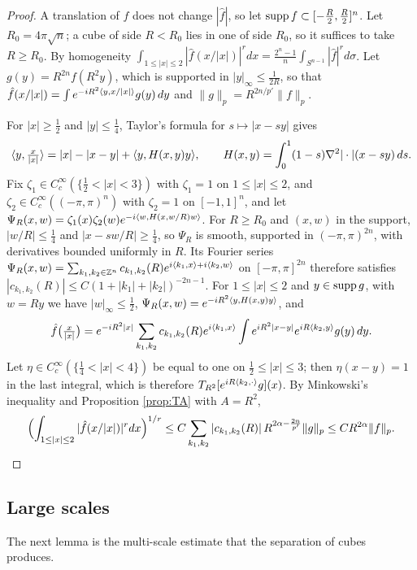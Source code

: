 \begin{proof}
A translation of $f$ does not change $|\hat f|$, so let $\operatorname{supp} f\subset[-\frac R2,\frac R2]^n$. Let
$R_0=4\pi\sqrt n$; a cube of side $R<R_0$ lies in one of side $R_0$, so it suffices to take $R\ge R_0$. By
homogeneity $\int_{1\le|x|\le2}|\hat f(x/|x|)|^rdx=\frac{2^n-1}n\int_{S^{n-1}}|\hat f|^rd\sigma$. Let
$g(y)=R^{2n}f(R^2y)$, which is supported in $|y|_\infty\le\frac1{2R}$, so that
$\hat f(x/|x|)=\int e^{-iR^2\langle y,x/|x|\rangle}g(y)\,dy$ and $\|g\|_p=R^{2n/p'}\|f\|_p$.

For $|x|\ge\frac12$ and $|y|\le\frac14$, Taylor's formula for $s\mapsto|x-sy|$ gives
\[
\langle y,\tfrac x{|x|}\rangle=|x|-|x-y|+\langle y,H(x,y)y\rangle,\qquad H(x,y)=\int_0^1(1-s)\nabla^2|\cdot|(x-sy)\,ds .
\]
Fix $\zeta_1\in C^\infty_c(\{\frac12<|x|<3\})$ with $\zeta_1=1$ on $1\le|x|\le2$, and
$\zeta_2\in C^\infty_c((-\pi,\pi)^n)$ with $\zeta_2=1$ on $[-1,1]^n$, and let
$\Psi_R(x,w)=\zeta_1(x)\zeta_2(w)e^{-i\langle w,H(x,w/R)w\rangle}$. For $R\ge R_0$ and $(x,w)$ in the support,
$|w/R|\le\frac14$ and $|x-sw/R|\ge\frac14$, so $\Psi_R$ is smooth, supported in $(-\pi,\pi)^{2n}$, with
derivatives bounded uniformly in $R$. Its Fourier series
$\Psi_R(x,w)=\sum_{k_1,k_2\in\mathbb{Z}^n}c_{k_1,k_2}(R)e^{i\langle k_1,x\rangle+i\langle k_2,w\rangle}$ on $[-\pi,\pi]^{2n}$ therefore satisfies
$|c_{k_1,k_2}(R)|\le C(1+|k_1|+|k_2|)^{-2n-1}$. For $1\le|x|\le2$ and $y\in\operatorname{supp} g$, with $w=Ry$ we have
$|w|_\infty\le\frac12$, $\Psi_R(x,w)=e^{-iR^2\langle y,H(x,y)y\rangle}$, and
\[
\hat f\bigl(\tfrac x{|x|}\bigr)=e^{-iR^2|x|}\sum_{k_1,k_2}c_{k_1,k_2}(R)e^{i\langle k_1,x\rangle}\int e^{iR^2|x-y|}e^{iR\langle k_2,y\rangle}g(y)\,dy .
\]
Let $\eta\in C^\infty_c(\{\frac14<|x|<4\})$ be equal to one on $\frac12\le|x|\le3$; then $\eta(x-y)=1$ in the last
integral, which is therefore $T_{R^2}[e^{iR\langle k_2,\cdot\rangle}g](x)$. By Minkowski's inequality and Proposition
\ref{prop:TA} with $A=R^2$,
\[
\Bigl(\int_{1\le|x|\le2}|\hat f(x/|x|)|^rdx\Bigr)^{1/r}\le C\sum_{k_1,k_2}|c_{k_1,k_2}(R)|\,R^{2\alpha-\frac{2n}{p'}}\|g\|_p
\le CR^{2\alpha}\|f\|_p . \qedhere
\]
\end{proof}

\subsection{Large scales}\label{ssec:largescales}
The next lemma is the multi-scale estimate that the separation of cubes produces.

